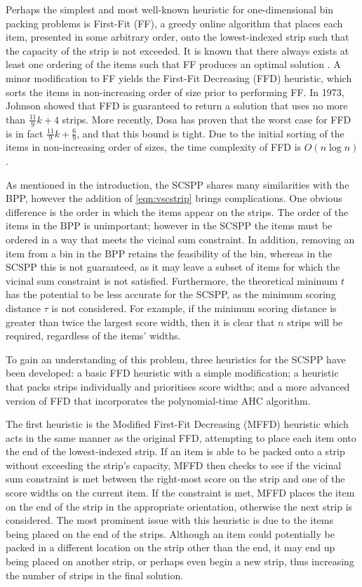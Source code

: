 \documentclass[runningheads]{llncs}
\begin{document}
Perhaps the simplest and most well-known heuristic for one-dimensional bin packing problems is First-Fit (FF), a greedy online algorithm that places each item, presented in some arbitrary order, onto the lowest-indexed strip such that the capacity of the strip is not exceeded. It is known that there always exists at least one ordering of the items such that FF produces an optimal solution \cite{lewis2009}. A minor modification to FF yields the First-Fit Decreasing (FFD) heuristic, which sorts the items in non-increasing order of size prior to performing FF. In 1973, Johnson \cite{johnson1973} showed that FFD is guaranteed to return a solution that uses no more than $\frac{11}{9}k + 4$ strips. More recently, Dosa \cite{dosa2007} has proven that the worst case for FFD is in fact $\frac{11}{9}k + \frac{6}{9}$, and that this bound is tight. Due to the initial sorting of the items in non-increasing order of sizes, the time complexity of FFD is $O(n\log n)$.

As mentioned in the introduction, the SCSPP shares many similarities with the BPP, however the addition of \eqref{eqn:vscstrip} brings complications. One obvious difference is the order in which the items appear on the strips. The order of the items in the BPP is unimportant; however in the SCSPP the items must be ordered in a way that meets the vicinal sum constraint. In addition, removing an item from a bin in the BPP retains the feasibility of the bin, whereas in the SCSPP this is not guaranteed, as it may leave a subset of items for which the vicinal sum constraint is not satisfied. Furthermore, the theoretical minimum $t$ has the potential to be less accurate for the SCSPP, as the minimum scoring distance $\tau$ is not considered. For example, if the minimum scoring distance is greater than twice the largest score width, then it is clear that $n$ strips will be required, regardless of the items' widths.

To gain an understanding of this problem, three heuristics for the SCSPP have been developed: a basic FFD heuristic with a simple modification; a heuristic that packs strips individually and prioritises score widths; and a more advanced version of FFD that incorporates the polynomial-time AHC algorithm.

The first heuristic is the Modified First-Fit Decreasing (MFFD) heuristic which acts in the same manner as the original FFD, attempting to place each item onto the end of the lowest-indexed strip. If an item is able to be packed onto a strip without exceeding the strip's capacity, MFFD then checks to see if the vicinal sum constraint is met between the right-most score on the strip and one of the score widths on the current item. If the constraint is met, MFFD places the item on the end of the strip in the appropriate orientation, otherwise the next strip is considered. The most prominent issue with this heuristic is due to the items being placed on the end of the strips. Although an item could potentially be packed in a different location on the strip other than the end, it may end up being placed on another strip, or perhaps even begin a new strip, thus increasing the number of strips in the final solution.
\end{document}
